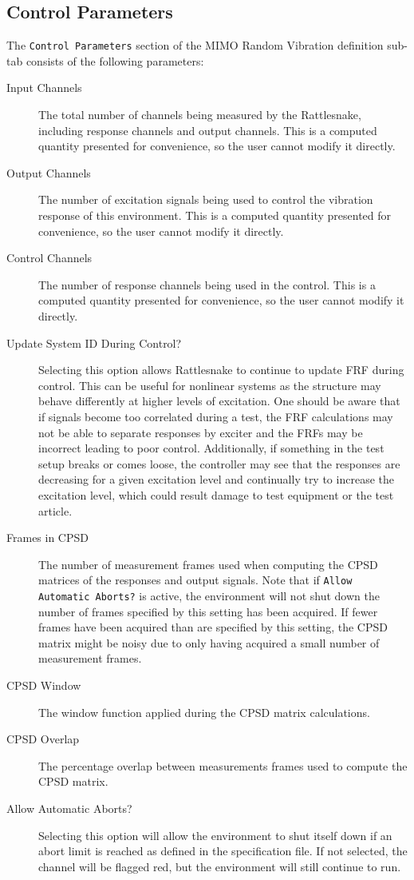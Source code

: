 \documentclass[pdf,12pt,report]{SANDreport}
\newcommand{\inlineCode}{\lstinline[basicstyle=\bfseries\ttfamily]}
\begin{document}
    \subsection{Control Parameters}
    The \inlineCode{Control Parameters} section of the \Ac{MIMO} Random Vibration definition sub-tab consists of the following parameters:
    \begin{description}
        \item[Input Channels] The total number of channels being measured by the Rattlesnake, including response channels and output channels.  This is a computed quantity presented for convenience, so the user cannot modify it directly.
        \item[Output Channels] The number of excitation signals being used to control the vibration response of this environment.  This is a computed quantity presented for convenience, so the user cannot modify it directly.
        \item[Control Channels] The number of response channels being used in the control.  This is a computed quantity presented for convenience, so the user cannot modify it directly.
        \item[Update System ID During Control?]  Selecting this option allows Rattlesnake to continue to update \Ac{FRF} during control.  This can be useful for nonlinear systems as the structure may behave differently at higher levels of excitation.  One should be aware that if signals become too correlated during a test, the \ac{FRF} calculations may not be able to separate responses by exciter and the \ac{FRF}s may be incorrect leading to poor control.  Additionally, if something in the test setup breaks or comes loose, the controller may see that the responses are decreasing for a given excitation level and continually try to increase the excitation level, which could result damage to test equipment or the test article.
        \item[Frames in CPSD] The number of measurement frames used when computing the \ac{CPSD} matrices of the responses and output signals.  Note that if \inlineCode{Allow Automatic Aborts?} is active, the environment will not shut down the number of frames specified by this setting has been acquired.  If fewer frames have been acquired than are specified by this setting, the \ac{CPSD} matrix might be noisy due to only having acquired a small number of measurement frames.
        \item[CPSD Window]  The window function applied during the \ac{CPSD} matrix calculations.
        \item[CPSD Overlap] The percentage overlap between measurements frames used to compute the CPSD matrix.
        \item[Allow Automatic Aborts?] Selecting this option will allow the environment to shut itself down if an abort limit is reached as defined in the specification file.  If not selected, the channel will be flagged red, but the environment will still continue to run.
    \end{description}
\end{document}
